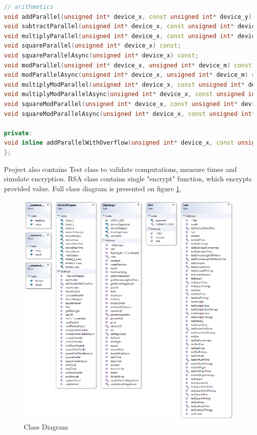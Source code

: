 \documentclass[oneside,openright,12pt,final,en]{mgr}
\begin{document}
\begin{lstlisting}[language=cpp,caption={DeviceWrapper.h}]
// arithmetics
void addParallel(unsigned int* device_x, const unsigned int* device_y) const;
void subtractParallel(unsigned int* device_x, const unsigned int* device_y) const;
void multiplyParallel(unsigned int* device_x, const unsigned int* device_y) const;
void squareParallel(unsigned int* device_x) const;
void squareParallelAsync(unsigned int* device_x) const;
void modParallel(unsigned int* device_x, unsigned int* device_m) const;
void modParallelAsync(unsigned int* device_x, unsigned int* device_m) const;
void multiplyModParallel(unsigned int* device_x, const unsigned int* device_y, const unsigned int* device_m) const;
void multiplyModParallelAsync(unsigned int* device_x, const unsigned int* device_y, const unsigned int* device_m) const;
void squareModParallel(unsigned int* device_x, const unsigned int* device_m) const;
void squareModParallelAsync(unsigned int* device_x, const unsigned int* device_m) const;

private:
void inline addParallelWithOverflow(unsigned int* device_x, const unsigned int* device_y, int blocks) const;
};
\end{lstlisting}

Project also contains Test class to validate computations, measure times and simulate encryption.
RSA class contains single "encrypt" function, which encrypts provided value. Full class diagram is presented on figure \ref{fig:classdiagram}.

\begin{figure}
	\centering
	\includegraphics{ClassDiagram}
	\caption{Class Diagram}
	\label{fig:classdiagram}
\end{figure}
\end{document}
